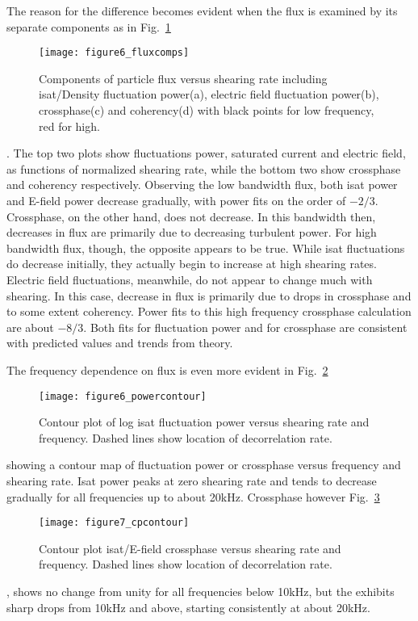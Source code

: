 \documentclass[%
 aip,
 amsmath,amssymb,
 preprint,%
]{revtex4-1}
\begin{document}
The reason for the difference becomes evident when the flux is examined by its separate components as in 
Fig.~\ref{fig:fluxcomps}
\begin{figure}
\texttt{[image: figure6\_fluxcomps]}%
\caption{\label{fig:fluxcomps} Components of particle flux versus shearing rate including isat/Density fluctuation power(a), electric field fluctuation power(b), crossphase(c) and coherency(d) with black points for low frequency, red for high.}
\end{figure}
. The top two plots show fluctuations power, saturated current and electric field, as functions of normalized shearing rate, while the bottom two show crossphase and coherency respectively. Observing the low bandwidth flux, both isat power and E-field power decrease gradually, with power fits on the order of $-2/3$. Crossphase, on the other hand, does not decrease. In this bandwidth then, decreases in flux are primarily due to decreasing turbulent power. For high bandwidth flux, though, the opposite appears to be true. While isat fluctuations do decrease initially, they actually begin to increase at high shearing rates. Electric field fluctuations, meanwhile, do not appear to change much with shearing. In this case, decrease in flux is primarily due to drops in crossphase and to some extent coherency. Power fits to this high frequency crossphase calculation are about $-8/3$. Both fits for fluctuation power and for crossphase are consistent with predicted values and trends from theory.

The frequency dependence on flux is even more evident in
Fig.~\ref{fig:powercontour}
\begin{figure}
\texttt{[image: figure6\_powercontour]}%
\caption{\label{fig:powercontour} Contour plot of log isat fluctuation power versus shearing rate and frequency. Dashed lines show location of decorrelation rate.}
\end{figure}
showing a contour map of fluctuation power or crossphase versus frequency and shearing rate. Isat power peaks at zero shearing rate and tends to decrease gradually for all frequencies up to about 20kHz. Crossphase however 
Fig.~\ref{fig:cpcontour}
\begin{figure}
\texttt{[image: figure7\_cpcontour]}%
\caption{\label{fig:cpcontour} Contour plot isat/E-field crossphase versus shearing rate and frequency. Dashed lines show location of decorrelation rate.}
\end{figure}
, shows no change from unity for all frequencies below 10kHz, but the exhibits sharp drops from 10kHz and above, starting consistently at about 20kHz. 
\end{document}
